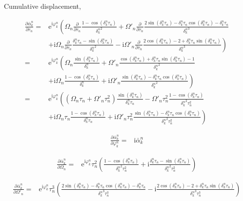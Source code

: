 \documentclass[10pt,fleqn]{article}
\newcommand{\ue}{\mathrm{e}}
\newcommand{\ui}{\mathrm{i}}
\newcommand{\eqar}[1]
{
  \begin{align*}
    #1
  \end{align*}
}
\newcommand{\paren}[1]{{\left({#1}\right)}}
\newcommand{\lparen}[1]{{\left({#1}\right.}}
\newcommand{\rparen}[1]{{\left.{#1}\right)}}
\newcommand{\pdiff}[3][{}]{{\frac{\partial^{#1} {#2}}{\partial {#3}{}^{#1}}}}
\begin{document}
Cumulative displacement,
\eqar{
  \pdiff{\bar\alpha_k^n}{\tau_n}=&\ue^{\ui\varphi_k^n}
  \lparen{
    \Omega_n\pdiff{}{\tau_n}\frac{1-\cos\paren{{\delta_k^n}\tau_n}}{{\delta_k^n}^2}
    +\Omega'_n\pdiff{}{\tau_n}\frac{2\sin\paren{{\delta_k^n}\tau_n}
      -{\delta_k^n}\tau_n\cos\paren{{\delta_k^n}\tau_n}
      -{\delta_k^n}\tau_n
    }{{\delta_k^n}^3}
  }\\
  &\rparen{
    +\ui\Omega_n\pdiff{}{\tau_n}\frac{\delta_k^n\tau_n-\sin\paren{{\delta_k^n}\tau_n}}{{\delta_k^n}^2}
    -\ui\Omega'_n\pdiff{}{\tau_n}\frac{2\cos\paren{{\delta_k^n}\tau_n}-2+\delta_k^n\tau_n\sin\paren{{\delta_k^n}\tau_n}}{{\delta_k^n}^3}
  }\\
  =&\ue^{\ui\varphi_k^n}
  \lparen{
    \Omega_n\frac{\sin\paren{{\delta_k^n}\tau_n}}{{\delta_k^n}}
    +\Omega'_n\frac{
      \cos\paren{{\delta_k^n}\tau_n}
      +{\delta_k^n}\tau_n\sin\paren{{\delta_k^n}\tau_n}
      -1
    }{{\delta_k^n}^2}
  }\\
  &\rparen{
    +\ui\Omega_n\frac{
      1-\cos\paren{{\delta_k^n}\tau_n}
    }{{\delta_k^n}}
    +\ui\Omega'_n\frac{
      \sin\paren{{\delta_k^n}\tau_n}
      -{\delta_k^n}\tau_n\cos\paren{{\delta_k^n}\tau_n}
    }{{\delta_k^n}^2}
  }\\
  =&\ue^{\ui\varphi_k^n}
  \lparen{
    \paren{\Omega_n\tau_n+\Omega'_n\tau_n^2}\frac{\sin\paren{{\delta_k^n}\tau_n}}{{\delta_k^n}\tau_n}
    -\Omega'_n\tau_n^2\frac{
      1-\cos\paren{{\delta_k^n}\tau_n}
    }{{\delta_k^n}^2\tau_n^2}
  }\\
  &\rparen{
    +\ui\Omega_n\tau_n\frac{
      1-\cos\paren{{\delta_k^n}\tau_n}
    }{{\delta_k^n}\tau_n}
    +\ui\Omega'_n\tau_n^2\frac{
      \sin\paren{{\delta_k^n}\tau_n}
      -{\delta_k^n}\tau_n\cos\paren{{\delta_k^n}\tau_n}
    }{{\delta_k^n}^2\tau_n^2}
  }
}
\eqar{
  \pdiff{\bar\alpha_k^n}{\varphi_k^n}=&\ui\bar\alpha_k^n
}
\eqar{
  \pdiff{\bar\alpha_k^n}{\Omega_n}=&\ue^{\ui\varphi_k^n}\tau_n^2
  \paren{
    \frac{1-\cos\paren{{\delta_k^n}\tau_n}}{{\delta_k^n}^2\tau_n^2}
    +\ui\frac{\delta_k^n\tau_n-\sin\paren{{\delta_k^n}\tau_n}}{{\delta_k^n}^2\tau_n^2}
  }
}
\eqar{
  \pdiff{\bar\alpha_k^n}{\Omega'_n}=&\ue^{\ui\varphi_k^n}\tau_n^3
  \paren{
    \frac{2\sin\paren{{\delta_k^n}\tau_n}
      -{\delta_k^n}\tau_n\cos\paren{{\delta_k^n}\tau_n}
      -{\delta_k^n}\tau_n
    }{{\delta_k^n}^3\tau_n^3}
    -\ui\frac{2\cos\paren{{\delta_k^n}\tau_n}-2+\delta_k^n\tau_n\sin\paren{{\delta_k^n}\tau_n}}{{\delta_k^n}^3\tau_n^3}
  }
}
\end{document}
